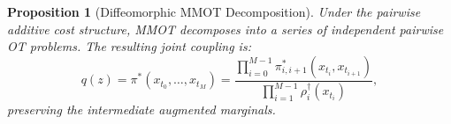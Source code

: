\documentclass[twoside]{article}
\newtheorem{proposition}{Proposition}[section]
\begin{document}
\begin{proposition}[Diffeomorphic MMOT Decomposition]
\label{thm:mmot-decomposition}
Under the pairwise additive cost structure, MMOT decomposes into a series of independent pairwise OT problems. The resulting joint coupling is:
\begin{equation}
q(z) = \pi^{*}(x_{t_0}, \ldots, x_{t_M}) = \frac{\prod_{i=0}^{M-1} \pi_{i,i+1}^{*}(x_{t_i}, x_{t_{i+1}})}{\prod_{i=1}^{M-1} \rho_i^{\dagger}(x_{t_i})},
\end{equation}
preserving the intermediate augmented marginals.
\end{proposition}



\end{document}
